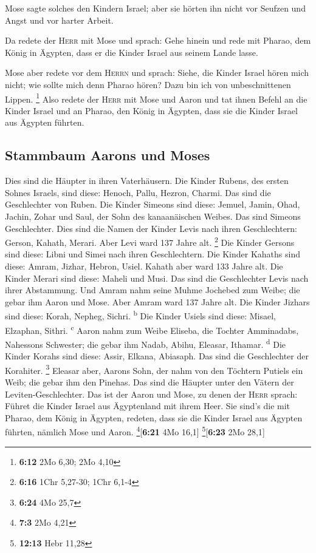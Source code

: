  Mose sagte solches den Kindern Israel; aber sie hörten
ihn nicht vor Seufzen und Angst und vor harter Arbeit.

 Da redete der \textsc{Herr} mit Mose und sprach:
 Gehe hinein und rede mit Pharao, dem König in Ägypten,
dass er die Kinder Israel aus seinem Lande lasse.

 Mose aber redete vor dem \textsc{Herrn} und sprach:
Siehe, die Kinder Israel hören mich nicht; wie sollte mich denn Pharao
hören? Dazu bin ich von unbeschnittenen Lippen. \footnote{\textbf{6:12}
  2Mo 6,30; 2Mo 4,10}  Also redete der \textsc{Herr} mit
Mose und Aaron und tat ihnen Befehl an die Kinder Israel und an Pharao,
den König in Ägypten, dass sie die Kinder Israel aus Ägypten führten.

\hypertarget{stammbaum-aarons-und-moses}{%
\subsection{Stammbaum Aarons und
Moses}\label{stammbaum-aarons-und-moses}}

 Dies sind die Häupter in ihren Vaterhäusern. Die Kinder
Rubens, des ersten Sohnes Israels, sind diese: Henoch, Pallu, Hezron,
Charmi. Das sind die Geschlechter von Ruben.  Die Kinder
Simeons sind diese: Jemuel, Jamin, Ohad, Jachin, Zohar und Saul, der
Sohn des kanaanäischen Weibes. Das sind Simeons Geschlechter.
 Dies sind die Namen der Kinder Levis nach ihren
Geschlechtern: Gerson, Kahath, Merari. Aber Levi ward 137 Jahre alt.
\footnote{\textbf{6:16} 1Chr 5,27-30; 1Chr 6,1-4}  Die
Kinder Gersons sind diese: Libni und Simei nach ihren Geschlechtern.
 Die Kinder Kahaths sind diese: Amram, Jizhar, Hebron,
Usiel. Kahath aber ward 133 Jahre alt.  Die Kinder Merari
sind diese: Maheli und Musi. Das sind die Geschlechter Levis nach ihrer
Abstammung.  Und Amram nahm seine Muhme Jochebed zum
Weibe; die gebar ihm Aaron und Mose. Aber Amram ward 137 Jahre alt.
 Die Kinder Jizhars sind diese: Korah, Nepheg, Sichri.
\textsuperscript{b}  Die Kinder Usiels sind diese:
Misael, Elzaphan, Sithri. \textsuperscript{c}  Aaron nahm
zum Weibe Eliseba, die Tochter Amminadabs, Nahessons Schwester; die
gebar ihm Nadab, Abihu, Eleasar, Ithamar. \textsuperscript{d}
 Die Kinder Korahs sind diese: Assir, Elkana, Abiasaph.
Das sind die Geschlechter der Korahiter. \footnote{\textbf{6:24} 4Mo
  25,7}  Eleasar aber, Aarons Sohn, der nahm von den
Töchtern Putiels ein Weib; die gebar ihm den Pinehas. Das sind die
Häupter unter den Vätern der Leviten-Geschlechter.  Das
ist der Aaron und Mose, zu denen der \textsc{Herr} sprach: Führet die
Kinder Israel aus Ägyptenland mit ihrem Heer.  Sie sind's
die mit Pharao, dem König in Ägypten, redeten, dass sie die Kinder
Israel aus Ägypten führten, nämlich Mose und Aaron.
\footnote{\textbf{7:3} 2Mo 4,21}{[}\textbf{6:21} 4Mo 16,1{]}
\footnote{\textbf{12:13} Hebr 11,28}{[}\textbf{6:23} 2Mo 28,1{]}

